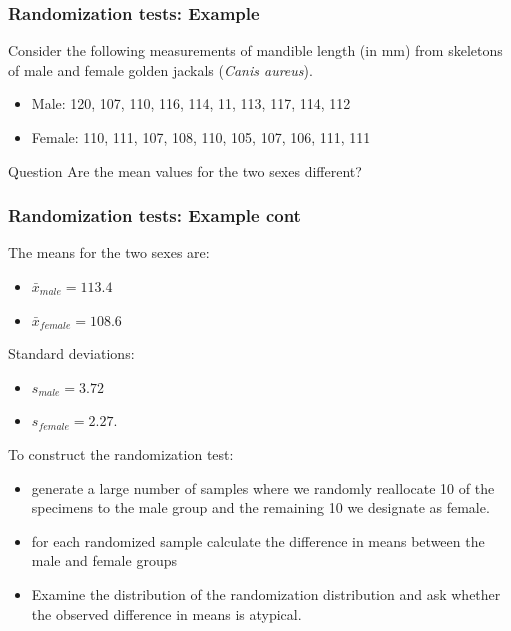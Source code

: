 \documentclass{beamer}
\begin{document}
\begin{frame}
  \frametitle{Randomization tests: Example}

Consider the following measurements of mandible length (in mm) from skeletons of male and female golden jackals (\emph{Canis aureus}).

\begin{itemize}
    \item Male: 120, 107, 110, 116, 114, 11, 113, 117, 114, 112
    \item Female: 110, 111, 107, 108, 110, 105, 107, 106, 111, 111
\end{itemize}

\begin{block}{Question}
Are the mean values for the two sexes different?
\end{block}

\end{frame}
\begin{frame}
  \frametitle{Randomization tests: Example cont}

The means for the two sexes are:
\begin{itemize}
    \item $\bar{x}_{male} = 113.4$
    \item $\bar{x}_{female} = 108.6$
\end{itemize}

Standard deviations:
\begin{itemize}
    \item $s_{male} = 3.72$
    \item $s_{female} = 2.27$.
\end{itemize}
\medskip

To construct the randomization test:
\begin{itemize}
    \item generate a large number of samples where we randomly reallocate 10 of the specimens to the male group and the remaining 10 we designate as female.
    \item for each randomized sample calculate the difference in means between the male and female groups
    \item Examine the distribution of the randomization distribution and ask whether the observed difference in means is atypical.

\end{itemize}




\end{frame}
\end{document}
